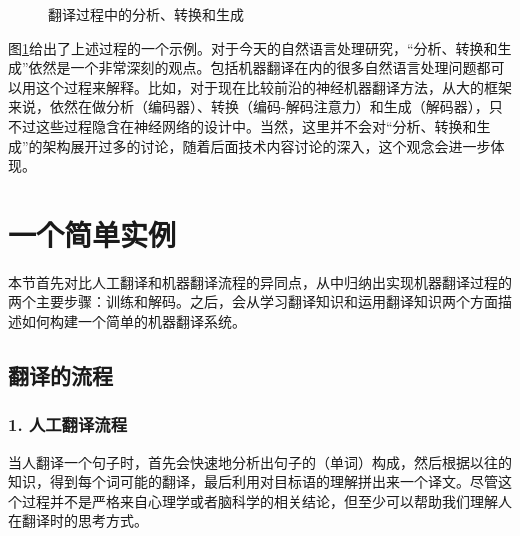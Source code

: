 \begin{figure}[htp]
 \centering

    \caption{翻译过程中的分析、转换和生成}
    \label{fig:5-2}
\end{figure}

\parinterval 图\ref{fig:5-2}给出了上述过程的一个示例。对于今天的自然语言处理研究，“分析、转换和生成”依然是一个非常深刻的观点。包括机器翻译在内的很多自然语言处理问题都可以用这个过程来解释。比如，对于现在比较前沿的神经机器翻译方法，从大的框架来说，依然在做分析（编码器）、转换（编码-解码注意力）和生成（解码器），只不过这些过程隐含在神经网络的设计中。当然，这里并不会对“分析、转换和生成”的架构展开过多的讨论，随着后面技术内容讨论的深入，这个观念会进一步体现。

\sectionnewpage
\section{一个简单实例}
\label{sec:simple-mt-example}

\parinterval 本节首先对比人工翻译和机器翻译流程的异同点，从中归纳出实现机器翻译过程的两个主要步骤：训练和解码。之后，会从学习翻译知识和运用翻译知识两个方面描述如何构建一个简单的机器翻译系统。


\subsection{翻译的流程}


\subsubsection*{1. 人工翻译流程}

\parinterval 当人翻译一个句子时，首先会快速地分析出句子的（单词）构成，然后根据以往的知识，得到每个词可能的翻译，最后利用对目标语的理解拼出来一个译文。尽管这个过程并不是严格来自心理学或者脑科学的相关结论，但至少可以帮助我们理解人在翻译时的思考方式。

